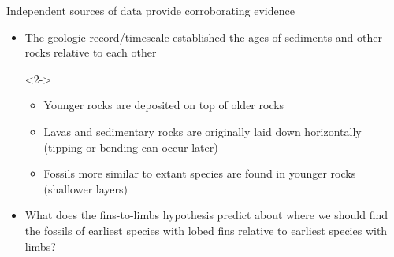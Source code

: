 \begin{frame}[t]
    \begin{adjustwidth}{-2em}{-1.5em}
        Independent sources of data provide corroborating evidence

        \begin{itemize}
            \item[1.] The geologic record/timescale established the ages of
                sediments and other rocks relative to each other

            \begin{uncoverenv}<2->
            \begin{itemize}
                \item Younger rocks are deposited on top of older rocks
                \item Lavas and sedimentary rocks are originally laid down
                    horizontally (tipping or bending can occur later)
                \item Fossils more similar to extant species are found in
                    younger rocks (shallower layers)
            \end{itemize}
            \end{uncoverenv}

            \item<3-> What does the fins-to-limbs hypothesis predict about where we
                should find the fossils of earliest species with lobed fins
                relative to earliest species with limbs?

        \end{itemize}

    \end{adjustwidth}
\end{frame}

